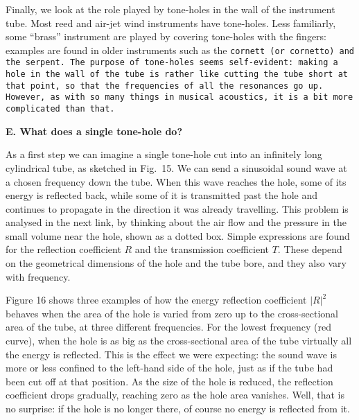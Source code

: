 
  Finally, we look at the role played by tone-holes in the wall of the 
  instrument tube. Most reed and air-jet wind instruments have tone-holes. Less 
  familiarly, some “brass” instrument are played by covering tone-holes with 
  the fingers: examples are found in older instruments such as the 
  \tt{}cornett\rm{} (or cornetto) and the \tt{}serpent\rm{}. The purpose of 
  tone-holes seems self-evident: making a hole in the wall of the tube is 
  rather like cutting the tube short at that point, so that the frequencies of 
  all the resonances go up. However, as with so many things in musical 
  acoustics, it is a bit more complicated than that. 

  \textbf{E. What does a single tone-hole do?} 

  As a first step we can imagine a single tone-hole cut into an infinitely long 
  cylindrical tube, as sketched in Fig.\ 15. We can send a sinusoidal sound 
  wave at a chosen frequency down the tube. When this wave reaches the hole, 
  some of its energy is reflected back, while some of it is transmitted past 
  the hole and continues to propagate in the direction it was already 
  travelling. This problem is analysed in the next link, by thinking about the 
  air flow and the pressure in the small volume near the hole, shown as a 
  dotted box. Simple expressions are found for the reflection coefficient $R$ 
  and the transmission coefficient $T$. These depend on the geometrical 
  dimensions of the hole and the tube bore, and they also vary with frequency. 


  Figure 16 shows three examples of how the energy reflection coefficient 
  $|R|^2$ behaves when the area of the hole is varied from zero up to the 
  cross-sectional area of the tube, at three different frequencies. For the 
  lowest frequency (red curve), when the hole is as big as the cross-sectional 
  area of the tube virtually all the energy is reflected. This is the effect we 
  were expecting: the sound wave is more or less confined to the left-hand side 
  of the hole, just as if the tube had been cut off at that position. As the 
  size of the hole is reduced, the reflection coefficient drops gradually, 
  reaching zero as the hole area vanishes. Well, that is no surprise: if the 
  hole is no longer there, of course no energy is reflected from it. 

